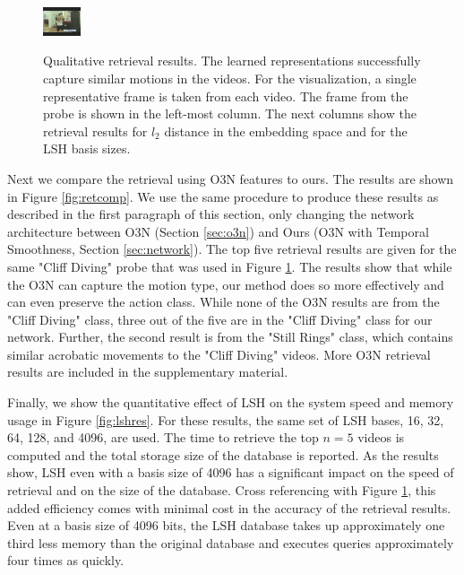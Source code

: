 \begin{figure}[t]
\begin{center}
\begin{tabu}
            \includegraphics[width=0.1\textwidth]{images/ret_results/2/16.png} \\ \hline            
        \end{tabu}
        \caption{Qualitative retrieval results. The learned representations successfully capture similar motions in the videos. For the visualization, a single representative frame is taken from each video. The frame from the probe is shown in the left-most column. The next columns show the retrieval results for $l_2$ distance in the embedding space and for the LSH basis sizes.  }
        \label{fig:retres}
    \end{center}
\end{figure}

Next we compare the retrieval using O3N features to ours. The results are shown in Figure \ref{fig:retcomp}. We use the same procedure to produce these results as described in the first paragraph of this section, only changing the network architecture between O3N (Section \ref{sec:o3n}) and Ours (O3N with Temporal Smoothness, Section \ref{sec:network}). The top five retrieval results are given for the same "Cliff Diving" probe that was used in Figure \ref{fig:retres}. The results show that while the O3N can capture the motion type, our method does so more effectively and can even preserve the action class. While none of the O3N results are from the "Cliff Diving" class, three out of the five are in the "Cliff Diving" class for our network. Further, the second result is from the "Still Rings" class, which contains similar acrobatic movements to the "Cliff Diving" videos. More O3N retrieval results are included in the supplementary material.

Finally, we show the quantitative effect of LSH on the system speed and memory usage in Figure \ref{fig:lshres}. For these results, the same set of LSH bases, 16, 32, 64, 128, and 4096, are used. The time to retrieve the top $n=5$ videos is computed and the total storage size of the database is reported. As the results show, LSH even with a basis size of 4096 has a significant impact on the speed of retrieval and on the size of the database. Cross referencing with Figure \ref{fig:retres}, this added efficiency comes with minimal cost in the accuracy of the retrieval results. Even at a basis size of 4096 bits, the LSH database takes up approximately one third less memory than the original database and executes queries approximately four times as quickly.


